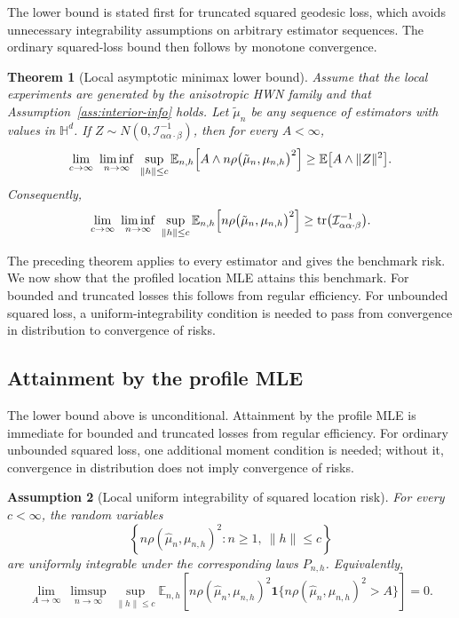\documentclass[11pt]{article}
\newtheorem{theorem}{Theorem}[section]
\newtheorem{assumption}[theorem]{Assumption}
\DeclareMathOperator{\tr}{tr}
\newcommand{\E}{\mathbb{E}}
\newcommand{\Hh}{\mathbb{H}}
\newcommand{\info}{\mathcal{I}}
\begin{document}
The lower bound is stated first for truncated squared geodesic loss, which avoids unnecessary integrability assumptions on arbitrary estimator sequences. The ordinary squared-loss bound then follows by monotone convergence.
\begin{theorem}[Local asymptotic minimax lower bound]
\label{thm:lower-bound}
Assume that the local experiments are generated by the anisotropic HWN family and that Assumption~\ref{ass:interior-info} holds. Let $\tilde\mu_n$ be any sequence of estimators with values in $\Hh^d$. If
$Z\sim N(0,\info_{\alpha\alpha\cdot\beta}^{-1})$, then for every $A<\infty$,
\begin{equation}
\label{eq:minimax-lower-trunc}
\lim_{c\to\infty}\ \liminf_{n\to\infty}\
\sup_{\|h\|\le c}
\E_{n,h}\Bigl[A\wedge n\rho\bigl(\tilde\mu_n,\mu_{n,h}\bigr)^2\Bigr]
\ge
\E\bigl[A\wedge \|Z\|^2\bigr].
\end{equation}
Consequently,
\begin{equation}
\label{eq:minimax-lower}
\lim_{c\to\infty}\ \liminf_{n\to\infty}\
\sup_{\|h\|\le c}
\E_{n,h}\Bigl[n\rho\bigl(\tilde\mu_n,\mu_{n,h}\bigr)^2\Bigr]
\ge
\tr\bigl(\info_{\alpha\alpha\cdot\beta}^{-1}\bigr).
\end{equation}
\end{theorem}
The preceding theorem applies to every estimator and gives the benchmark risk. We now show that the profiled location MLE attains this benchmark. For bounded and truncated losses this follows from regular efficiency. For unbounded squared loss, a uniform-integrability condition is needed to pass from convergence in distribution to convergence of risks.



\subsection{Attainment by the profile MLE}

The lower bound above is unconditional. Attainment by the profile MLE is immediate for bounded and truncated losses from regular efficiency. For ordinary unbounded squared loss, one additional moment condition is needed; without it, convergence in distribution does not imply convergence of risks.

\begin{assumption}[Local uniform integrability of squared location risk]
\label{ass:ui}
For every $c<\infty$, the random variables
\[
\left\{n\rho(\hat\mu_n,\mu_{n,h})^2:
 n\ge 1,\ \|h\|\le c\right\}
\]
are uniformly integrable under the corresponding laws $P_{n,h}$. Equivalently,
\[
\lim_{A\to\infty}\ \limsup_{n\to\infty}\
\sup_{\|h\|\le c}
\E_{n,h}\left[n\rho(\hat\mu_n,\mu_{n,h})^2
\mathbf 1\{n\rho(\hat\mu_n,\mu_{n,h})^2>A\}\right]=0 .
\]
\end{assumption}
\end{document}
